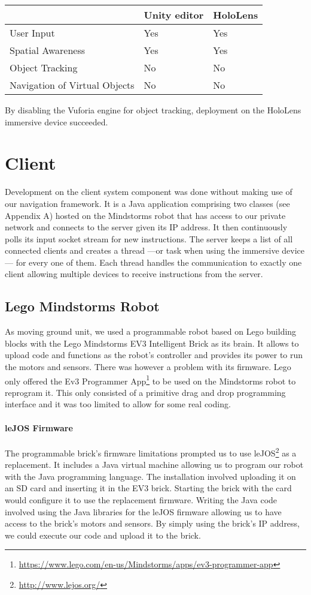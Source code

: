 \begin{center}
	\begin{tabularx}{\textwidth} {|X|X|X|}
		\hline
		& Unity editor & HoloLens \\
		\hline
		User Input &  Yes & Yes \\
		\hline
		Spatial Awareness & Yes & Yes \\
		\hline
		Object Tracking & No & No \\
		\hline
		Navigation of Virtual Objects & No & No \\
		\hline
	\end{tabularx}	
	\caption{By disabling the Vuforia engine for object tracking, deployment on the HoloLens immersive device succeeded.}
\end{center}

\section{Client}
Development on the client system component was done without making use of our navigation framework. It is a Java application comprising two classes (see Appendix A) hosted on the Mindstorms robot that has access to our private network and connects to the server given its IP address. It then continuously polls its input socket stream for new instructions. The server keeps a list of all connected clients and creates a thread ---or task when using the immersive device--- for every one of them. Each thread handles the communication to exactly one client allowing multiple devices to receive instructions from the server.

\subsection{Lego Mindstorms Robot}
As moving ground unit, we used a programmable robot based on Lego building blocks with the Lego Mindstorms EV3 Intelligent Brick as its brain. It allows to upload code and functions as the robot's controller and provides its power to run the motors and sensors. There was however a problem with its firmware. Lego only offered the Ev3 Programmer App\footnote{\protect\url{https://www.lego.com/en-us/Mindstorms/apps/ev3-programmer-app}} to be used on the Mindstorms robot to reprogram it. This only consisted of a primitive drag and drop programming interface and it was too limited to allow for some real coding.

\paragraph{leJOS Firmware}
The programmable brick's firmware limitations prompted us to use leJOS\footnote{\protect\url{http://www.lejos.org/}} as a replacement. It includes a Java virtual machine allowing us to program our robot with the Java programming language. The installation involved uploading it on an SD card and inserting it in the EV3 brick. Starting the brick with the card would configure it to use the replacement firmware. Writing the Java code involved using the Java libraries for the leJOS firmware allowing us to have access to the brick's motors and sensors. By simply using the brick's IP address, we could execute our code and upload it to the brick. 

